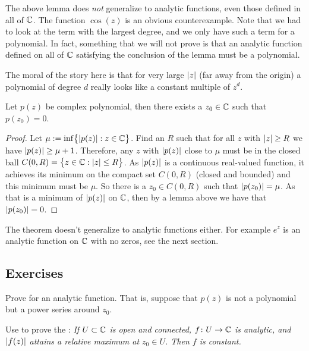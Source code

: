 The above lemma does \emph{not} generalize to analytic
functions, even those defined in all of ${\mathbb{C}}$.  The function
$\cos(z)$ is an obvious counterexample.
Note that we had to look
at the term with the largest degree, and we only have such a term for
a polynomial.  In fact, something that we will not prove is that
an analytic function defined on all of ${\mathbb{C}}$ satisfying the conclusion
of the lemma
must be a polynomial.

The moral of the story here is that for very large $\lvert {z} \rvert$ (far away from
the origin) a polynomial of degree $d$ really looks like a constant multiple
of $z^d$.

\begin{thm}
Let $p(z)$ be complex polynomial, then there exists a $z_0 \in {\mathbb{C}}$
such that $p(z_0) = 0$.
\end{thm}

\begin{proof}
Let $\mu := \inf \bigl\{ \lvert {p(z)} \rvert : z \in {\mathbb{C}} \bigr\}$.  Find an $R$ such that
for all $z$ with $\lvert {z} \rvert \geq R$ we have $\lvert {p(z)} \rvert \geq \mu+1$.
Therefore, any $z$ with $\lvert {p(z)} \rvert$ close to $\mu$ must be in the
closed ball $C(0,R) = \bigl\{ z \in {\mathbb{C}} : \lvert {z} \rvert \leq R \bigr\}$.  As $\lvert {p(z)} \rvert$
is a continuous real-valued function, it achieves its minimum
on the compact set $C(0,R)$ (closed and bounded) and this minimum must
be $\mu$.  So there is a $z_0 \in C(0,R)$ such that $\lvert {p(z_0)} \rvert = \mu$.
As that is a minimum of $\lvert {p(z)} \rvert$ on ${\mathbb{C}}$, then by a lemma above we have
that $\lvert {p(z_0)} \rvert = 0$.
\end{proof}

The theorem doesn't generalize to analytic functions either.  For example
$e^{z}$ is an analytic function on ${\mathbb{C}}$ with no zeros, see the next section.

\subsection{Exercises}

\begin{exercise} \label{exercise:minprinciple}
Prove  for an analytic function.  That
is, suppose that $p(z)$ is not a polynomial but a power series around $z_0$.
\end{exercise}

\begin{exercise}
Use  to prove the \emph{}: \emph{If $U \subset {\mathbb{C}}$ is open and connected,
$f \colon U \to {\mathbb{C}}$ is analytic, and $\lvert {f(z)} \rvert$ attains a relative
maximum at $z_0 \in U$.  Then $f$ is constant.}
\end{exercise}

